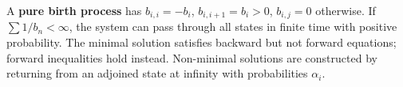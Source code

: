 A \textbf{pure birth process} has $b_{i,i} = -b_i$, $b_{i,i+1} = b_i > 0$, $b_{i,j} = 0$ otherwise. If $\sum 1/b_n < \infty$, the system can pass through all states in finite time with positive probability. The minimal solution satisfies backward but not forward equations; forward inequalities hold instead. Non-minimal solutions are constructed by returning from an adjoined state at infinity with probabilities $\alpha_i$.
